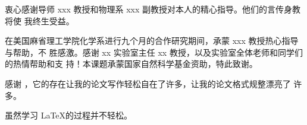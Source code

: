 \begin{acknowledgement}%
衷心感谢导师 xxx 教授和物理系 xxx 副教授对本人的精心指导。他们的言传身教将使
我终生受益。

在美国麻省理工学院化学系进行九个月的合作研究期间，承蒙 xxx 教授热心指导与帮助，不
胜感激。感谢 xx 实验室主任 xx 教授，以及实验室全体老师和同学们的热情帮助和支
持！本课题承蒙国家自然科学基金资助，特此致谢。

感谢 \tongjithesis{}，它的存在让我的论文写作轻松自在了许多，让我的论文格式规整漂亮了
许多。

虽然学习 \LaTeX 的过程并不轻松。

\end{acknowledgement}
